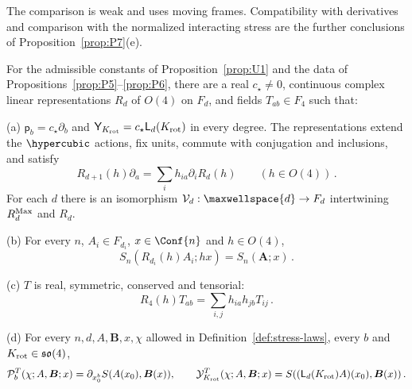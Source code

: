 \begin{remark}
The comparison is weak and uses moving frames. Compatibility with derivatives and comparison with the normalized interacting stress are the further conclusions of Proposition~\ref{prop:P7}\textup{(e)}.
\end{remark}

\begin{proposition}\label{prop:P7}
For the admissible constants of Proposition~\ref{prop:U1} and the data of Propositions~\ref{prop:P5}--\ref{prop:P6}, there are a real $c_\star\ne0$, continuous complex linear representations $R_d$ of $O(4)$ on $F_d$, and fields $T_{ab}\in F_4$ such that:

(a) $\mathsf p_b=c_\star\partial_b$ and $\mathsf Y_{K_{\rm rot}}=c_\star \mathsf L_d(K_{\rm rot})$ in every degree. The representations extend the $\hypercubic$ actions, fix units, commute with conjugation and inclusions, and satisfy
\begin{equation}\label{eq:P7-1}
R_{d+1}(h)\partial_a=\sum_i h_{ia}\partial_iR_d(h)\qquad(h\in O(4))\,.
\end{equation}
For each $d$ there is an isomorphism $\mathcal V_d:\maxwellspace{d}\to F_d$ intertwining $R_d^{\rm Max}$ and $R_d$.

(b) For every $n$, $A_i\in F_{d_i}$, $x\in\Conf{n}$ and $h\in O(4)$,
\begin{equation}\label{eq:P7-2}
S_n(R_{d_i}(h)A_i;hx)=S_n(\boldsymbol A;x)\,.
\end{equation}

(c) $T$ is real, symmetric, conserved and tensorial:
\begin{equation}\label{eq:P7-3}
R_4(h)T_{ab}=\sum_{i,j}h_{ia}h_{jb}T_{ij}\,.
\end{equation}

(d) For every $n,d,A,\boldsymbol B,x,\chi$ allowed in Definition~\ref{def:stress-laws}, every $b$ and $K_{\rm rot}\in\mathfrak{so}(4)$,
\begin{equation}\label{eq:P7-4}
\mathcal P_b^T(\chi;A,\boldsymbol B;x)=\partial_{x_0^b}S(A(x_0),\boldsymbol B(x)),\qquad
\mathcal Y_{K_{\rm rot}}^T(\chi;A,\boldsymbol B;x)=S((\mathsf L_d(K_{\rm rot})A)(x_0),\boldsymbol B(x))\,.
\end{equation}


\end{proposition}
